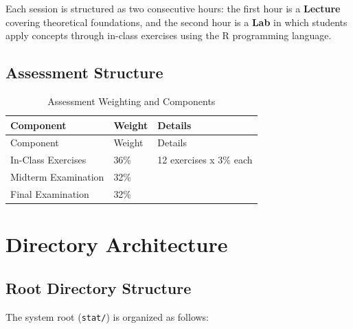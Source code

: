 \documentclass[
]{article}
\begin{document}
Each session is structured as two consecutive hours: the first hour is a
\textbf{Lecture} covering theoretical foundations, and the second hour
is a \textbf{Lab} in which students apply concepts through in-class
exercises using the R programming language.

\subsection{Assessment Structure}\label{assessment-structure}

\begin{longtable}[]{@{}lll@{}}
\caption{Assessment Weighting and Components}\tabularnewline
\toprule\noalign{}
Component & Weight & Details \\
\midrule\noalign{}
\endfirsthead
\toprule\noalign{}
Component & Weight & Details \\
\midrule\noalign{}
\endhead
\bottomrule\noalign{}
\endlastfoot
In-Class Exercises & 36\% & 12 exercises x 3\% each \\
Midterm Examination & 32\% & \\
Final Examination & 32\% & \\
\end{longtable}

\newpage

\section{Directory Architecture}\label{directory-architecture}

\subsection{Root Directory Structure}\label{root-directory-structure}

The system root (\texttt{stat/}) is organized as follows:
\end{document}
